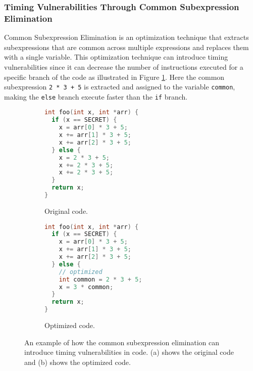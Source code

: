 \subsubsection{Timing Vulnerabilities Through Common Subexpression Elimination}
Common Subexpression Elimination is an optimization technique that extracts subexpressions that are common across multiple expressions and replaces them with a single variable.
This optimization technique can introduce timing vulnerabilities since it can decrease the number of instructions executed for a specific branch of the code as illustrated in Figure \ref{fig:common-subexpression-elimination}.
Here the common subexpression \texttt{2 * 3 + 5} is extracted and assigned to the variable \texttt{common}, making the \texttt{else} branch execute faster than the \texttt{if} branch.

\begin{figure}[H]
  \centering
     \begin{subfigure}[b]{0.3\textwidth}
        \begin{lstlisting}[style=defstyle, language=C]
int foo(int x, int *arr) {
  if (x == SECRET) {
    x = arr[0] * 3 + 5;
    x += arr[1] * 3 + 5;
    x += arr[2] * 3 + 5;
  } else {
    x = 2 * 3 + 5;
    x += 2 * 3 + 5;
    x += 2 * 3 + 5;
  }
  return x;
} \end{lstlisting} 
         \caption{Original code.}
    \end{subfigure}
    \hspace{1cm}
    \begin{subfigure}[b]{0.3\textwidth}
      \begin{lstlisting}[style=defstyle, language=C]
int foo(int x, int *arr) {
  if (x == SECRET) {
    x = arr[0] * 3 + 5;
    x += arr[1] * 3 + 5;
    x += arr[2] * 3 + 5;
  } else {
    // optimized
    int common = 2 * 3 + 5;
    x = 3 * common;
  }
  return x;
} \end{lstlisting} 
       \caption{Optimized code.}
  \end{subfigure}
  \caption{An example of how the common subexpression elimination can introduce timing vulnerabilities in code. (a) shows the original code and (b) shows the optimized code.}
  \label{fig:common-subexpression-elimination}
\end{figure}
